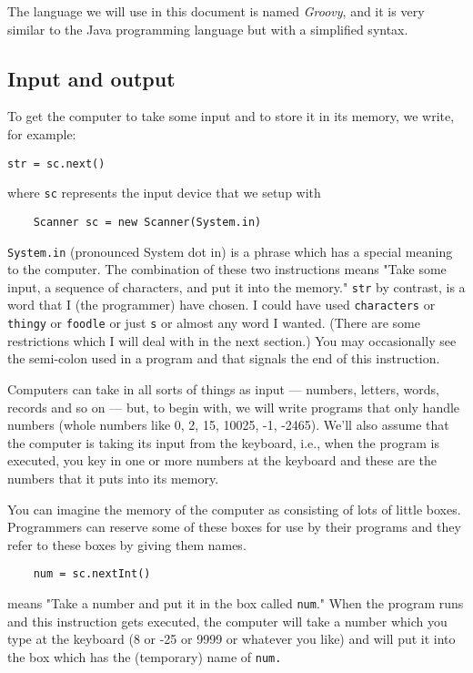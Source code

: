 The language we will use in this document is named \emph{Groovy}, and it is very similar to the Java programming language but with a simplified syntax.

\subsection{Input and output}

To get the computer to take some input and to store it
in its memory, we write, for example:
\begin{Verbatim}
str = sc.next()
\end{Verbatim}
where \verb!sc! represents the input device that we setup with 
\begin{Verbatim}
	Scanner sc = new Scanner(System.in)
\end{Verbatim}
\verb!System.in! (pronounced System dot in) is a phrase which has a special meaning to the
computer.  The combination of these two instructions means "Take some input, a sequence of characters, and put it into the memory."
\verb!str! by contrast, is a word that I (the programmer) have chosen.  I could
have used \verb!characters! or \verb!thingy! or \verb!foodle! or just \verb!s! or almost
any word I wanted. (There are some restrictions which I will deal with in the next section.)
You may occasionally see the semi-colon used in a program and that signals the end of this instruction.

Computers can take in all sorts of things as input --- numbers, letters, words,
records and so on --- but, to begin with, we will write programs that
only handle numbers (whole numbers like 0, 2, 15, 10025, -1, -2465).
We'll also assume that the computer is taking its input from the keyboard,
i.e., when the program is executed, you key in one or more numbers at the
keyboard and these are the numbers that it puts into its memory.

You can imagine the memory of the computer as consisting of lots of
little boxes.  Programmers can reserve some of these boxes for
use by their programs and they refer to these boxes by giving
them names.  
\begin{Verbatim}
	num = sc.nextInt()
\end{Verbatim}
means "Take a number and put it in the
box called \verb!num!."  When the program runs and this instruction gets
executed, the computer will take a number which you type at the keyboard
(8 or -25 or 9999 or whatever you like) and will put it into the box which
has the (temporary) name of \verb!num.!

